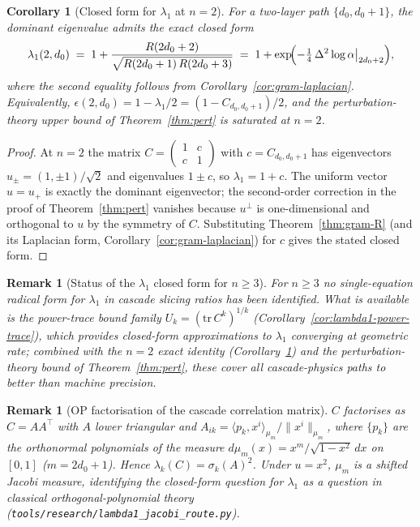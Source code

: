 \documentclass[11pt,a4paper]{article}
\newtheorem{corollary}[theorem]{Corollary}
\newtheorem{remark}[theorem]{Remark}
\begin{document}
\begin{corollary}[Closed form for $\lambda_1$ at $n = 2$]\label{cor:lambda1-n2}
For a two-layer path $\{d_0, d_0 + 1\}$, the dominant eigenvalue admits the exact closed form
\[
\lambda_1(2, d_0) \;=\; 1 + \frac{R(2 d_0 + 2)}{\sqrt{R(2 d_0 + 1)\,R(2 d_0 + 3)}}
\;=\; 1 + \exp\!\Bigl(-\tfrac{1}{4}\,\Delta^2 \log\alpha\big|_{2d_0+2}\Bigr),
\]
where the second equality follows from Corollary~\ref{cor:gram-laplacian}. Equivalently, $\epsilon(2, d_0) = 1 - \lambda_1/2 = (1 - C_{d_0, d_0+1})/2$, and the perturbation-theory upper bound of Theorem~\ref{thm:pert} is saturated at $n = 2$.
\end{corollary}

\begin{proof}
At $n = 2$ the matrix $C = \begin{pmatrix}1 & c \\ c & 1\end{pmatrix}$ with $c = C_{d_0, d_0 + 1}$ has eigenvectors $u_\pm = (1, \pm 1)/\sqrt{2}$ and eigenvalues $1 \pm c$, so $\lambda_1 = 1 + c$. The uniform vector $u = u_+$ is exactly the dominant eigenvector; the second-order correction in the proof of Theorem~\ref{thm:pert} vanishes because $u^\perp$ is one-dimensional and orthogonal to $u$ by the symmetry of $C$. Substituting Theorem~\ref{thm:gram-R} (and its Laplacian form, Corollary~\ref{cor:gram-laplacian}) for $c$ gives the stated closed form.
\end{proof}

\begin{remark}[Status of the $\lambda_1$ closed form for $n \geq 3$]\label{rem:lambda1-no-closed-form}
For $n \geq 3$ no single-equation radical form for $\lambda_1$ in cascade slicing ratios has been identified. What is available is the power-trace bound family $U_k = (\mathrm{tr}\,C^k)^{1/k}$ (Corollary~\ref{cor:lambda1-power-trace}), which provides closed-form approximations to $\lambda_1$ converging at geometric rate; combined with the $n = 2$ exact identity (Corollary~\ref{cor:lambda1-n2}) and the perturbation-theory bound of Theorem~\ref{thm:pert}, these cover all cascade-physics paths to better than machine precision.
\end{remark}

\begin{remark}[OP factorisation of the cascade correlation matrix]\label{rem:lambda1-OP-factorisation}
$C$ factorises as $C = A A^{\top}$ with $A$ lower triangular and $A_{ik} = \langle p_k, x^i\rangle_{\mu_m} / \|x^i\|_{\mu_m}$, where $\{p_k\}$ are the orthonormal polynomials of the measure $d\mu_m(x) = x^m/\sqrt{1-x^2}\,dx$ on $[0,1]$ ($m = 2 d_0 + 1$). Hence $\lambda_k(C) = \sigma_k(A)^2$. Under $u = x^2$, $\mu_m$ is a shifted Jacobi measure, identifying the closed-form question for $\lambda_1$ as a question in classical orthogonal-polynomial theory (\texttt{tools/research/lambda1\_jacobi\_route.py}).
\end{remark}
\end{document}
